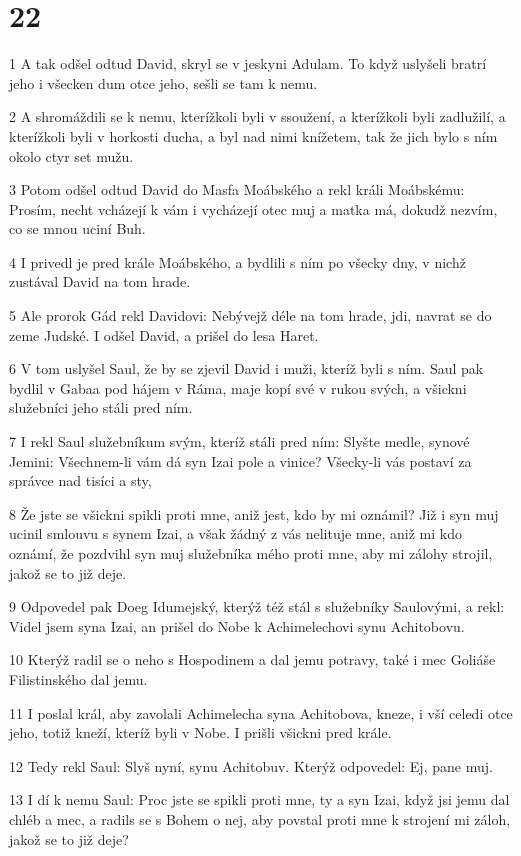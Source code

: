 \chapter{22}

\par 1 A tak odšel odtud David, skryl se v jeskyni Adulam. To když uslyšeli bratrí jeho i všecken dum otce jeho, sešli se tam k nemu.
\par 2 A shromáždili se k nemu, kterížkoli byli v ssoužení, a kterížkoli byli zadlužilí, a kterížkoli byli v horkosti ducha, a byl nad nimi knížetem, tak že jich bylo s ním okolo ctyr set mužu.
\par 3 Potom odšel odtud David do Masfa Moábského a rekl králi Moábskému: Prosím, necht vcházejí k vám i vycházejí otec muj a matka má, dokudž nezvím, co se mnou uciní Buh.
\par 4 I privedl je pred krále Moábského, a bydlili s ním po všecky dny, v nichž zustával David na tom hrade.
\par 5 Ale prorok Gád rekl Davidovi: Nebývejž déle na tom hrade, jdi, navrat se do zeme Judské. I odšel David, a prišel do lesa Haret.
\par 6 V tom uslyšel Saul, že by se zjevil David i muži, kteríž byli s ním. Saul pak bydlil v Gabaa pod hájem v Ráma, maje kopí své v rukou svých, a všickni služebníci jeho stáli pred ním.
\par 7 I rekl Saul služebníkum svým, kteríž stáli pred ním: Slyšte medle, synové Jemini: Všechnem-li vám dá syn Izai pole a vinice? Všecky-li vás postaví za správce nad tisíci a sty,
\par 8 Že jste se všickni spikli proti mne, aniž jest, kdo by mi oznámil? Již i syn muj ucinil smlouvu s synem Izai, a však žádný z vás nelituje mne, aniž mi kdo oznámí, že pozdvihl syn muj služebníka mého proti mne, aby mi zálohy strojil, jakož se to již deje.
\par 9 Odpovedel pak Doeg Idumejský, kterýž též stál s služebníky Saulovými, a rekl: Videl jsem syna Izai, an prišel do Nobe k Achimelechovi synu Achitobovu.
\par 10 Kterýž radil se o neho s Hospodinem a dal jemu potravy, také i mec Goliáše Filistinského dal jemu.
\par 11 I poslal král, aby zavolali Achimelecha syna Achitobova, kneze, i vší celedi otce jeho, totiž kneží, kteríž byli v Nobe. I prišli všickni pred krále.
\par 12 Tedy rekl Saul: Slyš nyní, synu Achitobuv. Kterýž odpovedel: Ej, pane muj.
\par 13 I dí k nemu Saul: Proc jste se spikli proti mne, ty a syn Izai, když jsi jemu dal chléb a mec, a radils se s Bohem o nej, aby povstal proti mne k strojení mi záloh, jakož se to již deje?

